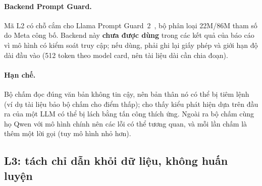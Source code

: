 \paragraph{Backend Prompt Guard.} Mã L2 có chỗ cắm cho Llama Prompt Guard~2~\citep{promptguard2}, bộ phân loại 22M/86M tham số do Meta công bố. Backend này \textbf{chưa được dùng} trong các kết quả của báo cáo vì mô hình có kiểm soát truy cập; nếu dùng, phải ghi lại giấy phép và giới hạn độ dài đầu vào (512 token theo model card, nên tài liệu dài cần chia đoạn).

\paragraph{Hạn chế.} Bộ chấm đọc đúng văn bản không tin cậy, nên bản thân nó có thể bị tiêm lệnh (ví dụ tài liệu bảo bộ chấm cho điểm thấp); \citet{choudhary2025hownot} cho thấy kiểu phát hiện dựa trên đầu ra của một LLM có thể bị lách bằng tấn công thích ứng. Ngoài ra bộ chấm cùng họ Qwen với mô hình chính nên các lỗi có thể tương quan, và mỗi lần chấm là thêm một lời gọi (tuy mô hình nhỏ hơn).

\subsection{L3: tách chỉ dẫn khỏi dữ liệu, không huấn luyện}
